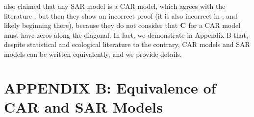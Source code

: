 \documentclass[11pt, titlepage]{article}\usepackage[]{graphicx}\usepackage[]{color}
\begin{document}
\begin{spacing}{1.9}
\begin{flushleft}
\citet{Dorm:etal:meth:2007} also claimed that any SAR model is a CAR model, which agrees with the literature \citep[e.g.,][p. 409]{Cres:stat:1993}, but then they show an incorrect proof (it is also incorrect in \citet[][p. 89]{Hain:spat:1990}, and likely beginning there), because they do not consider that $\mathbf{C}$ for a CAR model must have zeros along the diagonal.  In fact, we demonstrate in Appendix B that, despite statistical and ecological literature to the contrary, CAR models and SAR models can be written equivalently, and we provide details.


\clearpage
\setcounter{equation}{0}
\renewcommand{\theequation}{B.\arabic{equation}}
\setcounter{figure}{0}
\renewcommand{\thefigure}{B.\arabic{figure}}
\section{APPENDIX B: Equivalence of CAR and SAR Models}


\end{flushleft}
\end{spacing}
\end{document}
